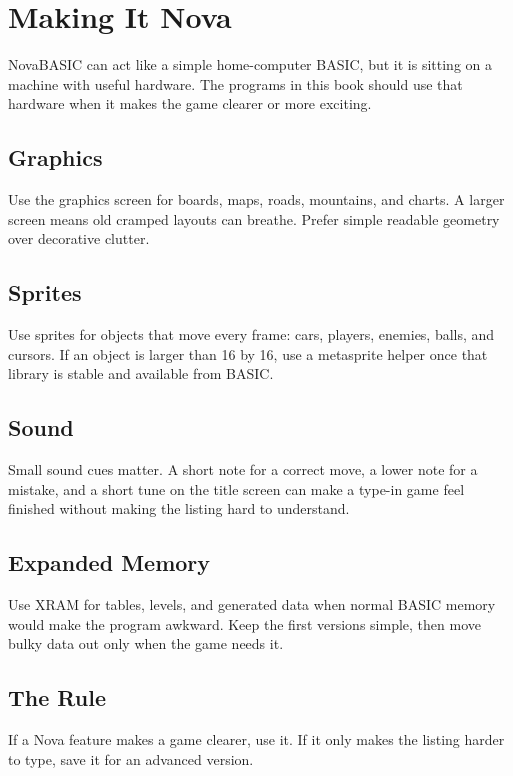 \chapter{Making It Nova}

NovaBASIC can act like a simple home-computer BASIC, but it is sitting on a
machine with useful hardware. The programs in this book should use that
hardware when it makes the game clearer or more exciting.

\section{Graphics}

Use the graphics screen for boards, maps, roads, mountains, and charts. A
larger screen means old cramped layouts can breathe. Prefer simple readable
geometry over decorative clutter.

\section{Sprites}

Use sprites for objects that move every frame: cars, players, enemies, balls,
and cursors. If an object is larger than 16 by 16, use a metasprite helper once
that library is stable and available from BASIC.

\section{Sound}

Small sound cues matter. A short note for a correct move, a lower note for a
mistake, and a short tune on the title screen can make a type-in game feel
finished without making the listing hard to understand.

\section{Expanded Memory}

Use XRAM for tables, levels, and generated data when normal BASIC memory would
make the program awkward. Keep the first versions simple, then move bulky data
out only when the game needs it.

\section{The Rule}

If a Nova feature makes a game clearer, use it. If it only makes the listing
harder to type, save it for an advanced version.
